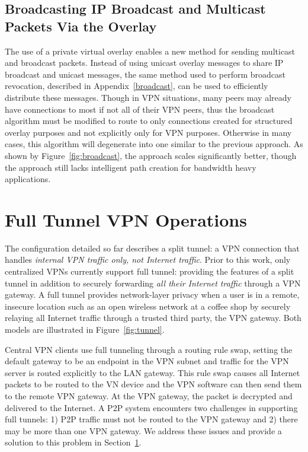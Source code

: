 \subsection{Broadcasting IP Broadcast and Multicast Packets Via the Overlay}
The use of a private virtual overlay enables a new method for sending multicast
and broadcast packets.  Instead of using unicast overlay messages to share
IP broadcast and unicast messages, the same method used to perform broadcast
revocation, described in Appendix~\ref{broadcast}, can be used to efficiently
distribute these messages.  Though in VPN situations, many peers may already
have connections to most if not all of their VPN peers, thus the broadcast
algorithm must be modified to route to only connections created for structured
overlay purposes and not explicitly only for VPN purposes.  Otherwise in many
cases, this algorithm will degenerate into one similar to the previous
approach.  As shown by Figure~\ref{fig:broadcast}, the approach scales
significantly better, though the approach still lacks intelligent path creation
for bandwidth heavy applications.

\section{Full Tunnel VPN Operations}
\label{full_tunnel}
The configuration detailed so far describes a split tunnel: a VPN connection
that handles \emph{internal VPN traffic only, not Internet traffic}.  Prior
to this work, only centralized VPNs currently support full tunnel: providing
the features of a split tunnel in addition to securely forwarding
\emph{all their Internet traffic} through a VPN gateway.  A full tunnel provides
network-layer privacy when a user is in a remote, insecure location such as an
open wireless network at a coffee shop by securely relaying all Internet traffic
through a trusted third party, the VPN gateway.  Both models are illustrated
in Figure~\ref{fig:tunnel}.

Central VPN clients use full tunneling through a routing rule swap, setting
the default gateway to be an endpoint in the VPN subnet and traffic for the
VPN server is routed explicitly to the LAN gateway.  This rule swap causes
all Internet packets to be routed to the VN device and the VPN software
can then send them to the remote VPN gateway.  At the VPN gateway, the packet
is decrypted and delivered to the Internet.  A P2P system encounters two
challenges in supporting full tunnels:  1) P2P traffic must not be routed
to the VPN gateway and 2) there may be more than one VPN gateway.  We address
these issues and provide a solution to this problem in Section~\ref{full_tunnel}.

